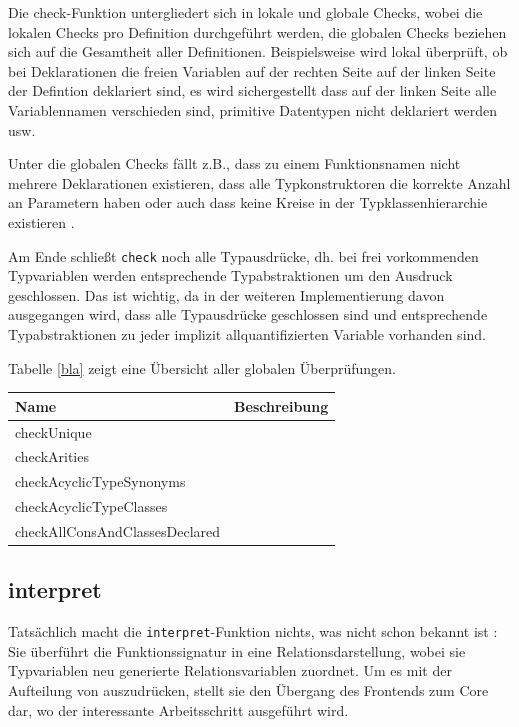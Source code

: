 \documentclass[11pt]{article} %
\begin{document}
Die check-Funktion untergliedert sich in lokale und globale Checks, wobei die lokalen Checks pro Definition durchgeführt werden, die globalen Checks beziehen sich auf die Gesamtheit aller Definitionen. Beispielsweise wird lokal überprüft, ob bei Deklarationen die freien Variablen auf der rechten Seite auf der linken Seite der Defintion deklariert sind, es wird sichergestellt
dass auf der linken Seite alle Variablennamen verschieden sind, primitive Datentypen nicht deklariert werden usw.

Unter die globalen Checks fällt z.B., dass zu einem Funktionsnamen nicht mehrere Deklarationen existieren, dass alle Typkonstruktoren die korrekte Anzahl an Parametern haben oder auch dass keine Kreise in der Typklassenhierarchie existieren \cite{freetheorems}.

Am Ende schließt \texttt{check} noch alle Typausdrücke, dh. bei frei vorkommenden Typvariablen werden entsprechende Typabstraktionen um den Ausdruck geschlossen. Das ist wichtig, da in der weiteren Implementierung davon ausgegangen wird, dass alle Typausdrücke geschlossen sind und entsprechende Typabstraktionen zu jeder implizit allquantifizierten Variable vorhanden sind.

Tabelle \ref{bla} zeigt eine Übersicht aller globalen Überprüfungen.

\begin{tabular}{| l | l |}
\hline
Name&Beschreibung\\
\hline
  checkUnique&\\
  checkArities&\\
  checkAcyclicTypeSynonyms&\\
  checkAcyclicTypeClasses&\\
  checkAllConsAndClassesDeclared&\\
\hline
\end{tabular}

\subsection{interpret}

Tatsächlich macht die \texttt{interpret}-Funktion nichts, was nicht schon bekannt ist : Sie überführt die Funktionssignatur in eine
Relationsdarstellung, wobei sie Typvariablen neu generierte Relationsvariablen zuordnet. Um es mit der Aufteilung von \cite{freetheorems} auszudrücken, stellt sie den Übergang des Frontends zum Core dar, wo der interessante Arbeitsschritt ausgeführt wird.
\end{document}
